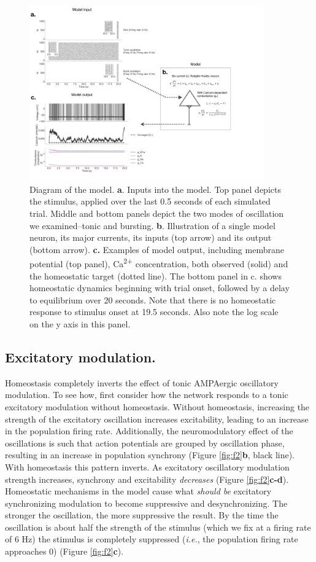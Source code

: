 \documentclass{article}
\begin{document}
\begin{figure}
\centering
\includegraphics[width=0.9\textwidth]{fig1.png}
\caption{\label{fig:f1}
    Diagram of the model. \textbf{a}. Inputs into the model. Top panel depicts the stimulus, applied over the last 0.5 seconds of each simulated trial. Middle and bottom panels depict the two modes of oscillation we examined--tonic and bursting. 
    \textbf{b}. Illustration of a single model neuron, its major currents, its inputs (top arrow) and its output (bottom arrow).
    \textbf{c.} Examples of model output, including membrane potential (top panel), Ca\textsuperscript{2+} concentration, both observed (solid) and the homeostatic target (dotted line). The bottom panel in c. shows homeostatic dynamics beginning with trial onset, followed by a delay to equilibrium over 20 seconds. Note that there is no homeostatic response to stimulus onset at 19.5 seconds. Also note the log scale on the y axis in this panel.
}
\end{figure}

\subsection*{Excitatory modulation.}
Homeostasis completely inverts the effect of tonic AMPAergic oscillatory modulation. To see how, first consider how the network responds to a tonic excitatory modulation without homeostasis. Without homeostasis, increasing the strength of the excitatory oscillation increases excitability, leading to an increase in the population firing rate. Additionally, the neuromodulatory effect of the oscillations is such that action potentials are grouped by oscillation phase, resulting in an increase in population synchrony (Figure \ref{fig:f2}\textbf{b}, black line). With homeostasis this pattern inverts. As excitatory oscillatory modulation strength increases, synchrony and excitability \emph{decreases} (Figure \ref{fig:f2}\textbf{c-d}). Homeostatic mechanisms in the model cause what \emph{should be} excitatory synchronizing modulation to become suppressive and desynchronizing. The stronger the oscillation, the more suppressive the result. By the time the oscillation is about half the strength of the stimulus (which we fix at a firing rate of 6 Hz) the stimulus is completely suppressed (\textit{i.e.}, the population firing rate approaches 0) (Figure \ref{fig:f2}\textbf{c}).
\end{document}
